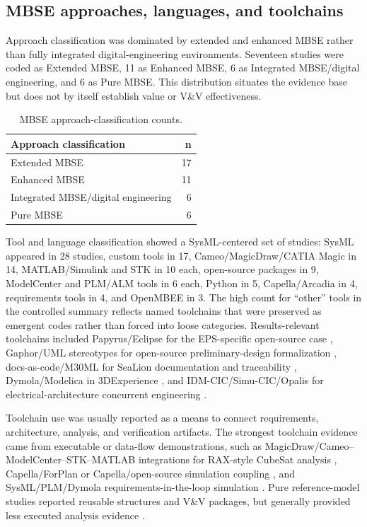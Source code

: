 \subsection{MBSE approaches, languages, and toolchains}
\label{sec:results-approaches-tools}

Approach classification was dominated by extended and enhanced MBSE rather than fully integrated digital-engineering environments.  Seventeen studies were coded as Extended MBSE, 11 as Enhanced MBSE, 6 as Integrated MBSE/digital engineering, and 6 as Pure MBSE.  This distribution situates the evidence base but does not by itself establish value or V\&V effectiveness.

\begin{table}[htbp]
\centering
\caption{MBSE approach-classification counts.}
\label{tab:results-approach-counts}
\begin{tabular}{lr}
\toprule
Approach classification & n \\
\midrule
Extended MBSE & 17 \\
Enhanced MBSE & 11 \\
Integrated MBSE/digital engineering & 6 \\
Pure MBSE & 6 \\
\bottomrule
\end{tabular}
\end{table}

Tool and language classification showed a SysML-centered set of studies: SysML appeared in 28 studies, custom tools in 17, Cameo/MagicDraw/CATIA Magic in 14, MATLAB/Simulink and STK in 10 each, open-source packages in 9, ModelCenter and PLM/ALM tools in 6 each, Python in 5, Capella/Arcadia in 4, requirements tools in 4, and OpenMBEE in 3.  The high count for ``other'' tools in the controlled summary reflects named toolchains that were preserved as emergent codes rather than forced into loose categories.  Results-relevant toolchains included Papyrus/Eclipse for the EPS-specific open-source case \cite{paper-0026}, Gaphor/UML stereotypes for open-source preliminary-design formalization \cite{paper-0029}, docs-as-code/M30ML for SeaLion documentation and traceability \cite{paper-0037}, Dymola/Modelica in 3DExperience \cite{paper-0059}, and IDM-CIC/Simu-CIC/Opalis for electrical-architecture concurrent engineering \cite{paper-0053}.

Toolchain use was usually reported as a means to connect requirements, architecture, analysis, and verification artifacts.  The strongest toolchain evidence came from executable or data-flow demonstrations, such as MagicDraw/Cameo--ModelCenter--STK--MATLAB integrations for RAX-style CubeSat analysis \cite{paper-0001,paper-0003}, Capella/ForPlan or Capella/open-source simulation coupling \cite{paper-0033,paper-0043}, and SysML/PLM/Dymola requirements-in-the-loop simulation \cite{paper-0059}.  Pure reference-model studies reported reusable structures and V\&V packages, but generally provided less executed analysis evidence \cite{paper-0015,paper-0077}.

